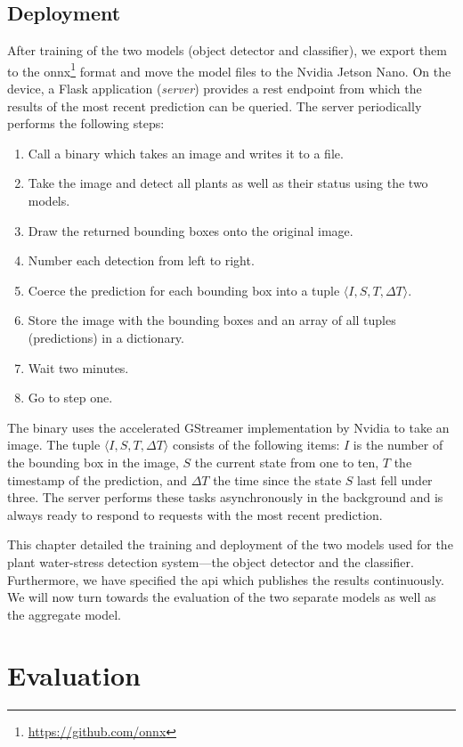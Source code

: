 \documentclass[final]{vutinfth} %
\begin{document}
\section{Deployment}

After training of the two models (object detector and classifier), we
export them to the \gls{onnx}\footnote{\url{https://github.com/onnx}}
format and move the model files to the Nvidia Jetson Nano. On the
device, a Flask application (\emph{server}) provides a \gls{rest}
endpoint from which the results of the most recent prediction can be
queried. The server periodically performs the following steps:

\begin{enumerate}
\item Call a binary which takes an image and writes it to a file.
\item Take the image and detect all plants as well as their status
  using the two models.
\item Draw the returned bounding boxes onto the original image.
\item Number each detection from left to right.
\item Coerce the prediction for each bounding box into a tuple
  $\langle I, S, T,\Delta T \rangle$.
\item Store the image with the bounding boxes and an array of all
  tuples (predictions) in a dictionary.
\item Wait two minutes.
\item Go to step one.
\end{enumerate}

The binary uses the accelerated GStreamer implementation by Nvidia to
take an image. The tuple $\langle I, S, T,\Delta T \rangle$ consists of the following
items: $I$ is the number of the bounding box in the image, $S$ the
current state from one to ten, $T$ the timestamp of the prediction,
and $\Delta T$ the time since the state $S$ last fell under three. The
server performs these tasks asynchronously in the background and is
always ready to respond to requests with the most recent prediction.

This chapter detailed the training and deployment of the two models
used for the plant water-stress detection system—the object detector
and the classifier. Furthermore, we have specified the \gls{api} which
publishes the results continuously. We will now turn towards the
evaluation of the two separate models as well as the aggregate model.

\chapter{Evaluation}
\label{chap:evaluation}
\end{document}
